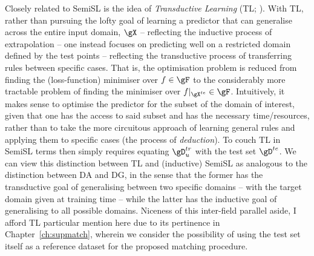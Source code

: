 %
Closely related to \ac{SemiSL} is the idea of \emph{Transductive Learning} (TL;
\citealp{gammerman1998learning}).
%
With TL, rather than pursuing the lofty goal of learning a predictor that can generalise across the
entire input domain, \( \gX \) -- reflecting the inductive process of extrapolation -- one instead
focuses on predicting well on a restricted domain defined by the test points -- reflecting the
transductive process of transferring rules between specific cases. 
%
%
That is, the optimisation problem is reduced from finding the (loss-function) minimiser over \(f
\in \gF \)  to the considerably more tractable problem of finding the minimiser over \(
f|_{\gX^{te}} \in \gF \).
%
Intuitively, it makes sense to optimise the predictor for the subset of the domain of interest,
given that one has the access to said subset and has the necessary time/resources, rather than to
take the more circuitous approach of learning general rules and applying them to specific cases
(the process of \emph{deduction}).
%
To couch TL in \ac{SemiSL} terms then simply requires equating \(\gD^{tr}_u \) with the test set
\(\gD^{te} \).
%
We can view this distinction between TL and (inductive) \ac{SemiSL} as analogous to the distinction
between \ac{DA} and \ac{DG}, in the sense that the former has the transductive goal of generalising
between two specific domains -- with the target domain given at training time -- while the latter
has the inductive goal of generalising to all possible domains.
%
Niceness of this inter-field parallel aside, I afford TL particular mention here due to its
pertinence in Chapter~\ref{ch:supmatch}, wherein we consider the possibility of using the test set
itself as a reference dataset for the proposed matching procedure.



